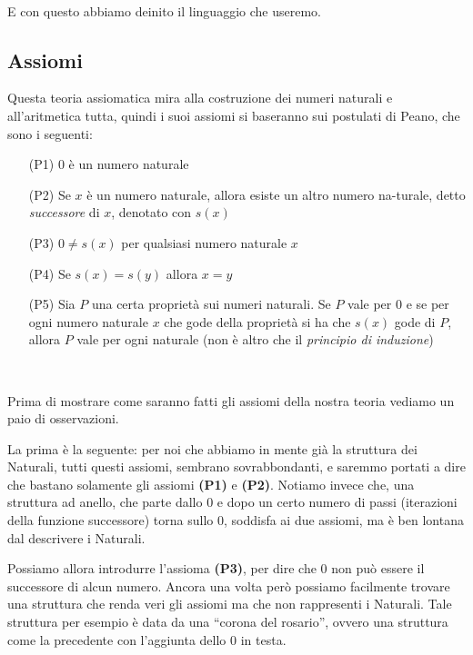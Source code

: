 \begin{enumerate}
\begin{itemize}
\end{itemize}

\end{enumerate}\par\ \par\noindent
\vspace{.5cm}

E con questo abbiamo deinito il linguaggio che useremo.
\subsection{Assiomi}
Questa teoria assiomatica mira alla costruzione dei numeri naturali e all'aritmetica tutta, quindi i suoi 
assiomi si baseranno sui postulati di Peano, che sono i seguenti:
\begin{enumerate}
	\item[(P1)] $0$ \`e un numero naturale
	\item[(P2)] Se $x$ \`e un numero naturale, allora esiste un altro numero na-turale, detto \textsl{successore} di $x$, denotato con $s(x)$
	\item[(P3)] $0\neq s(x)$ per qualsiasi numero naturale $x$
	\item[(P4)] Se $s(x)=s(y)$ allora $x=y$
	\item[(P5)] Sia $P$ una certa propriet\`a sui numeri naturali. Se $P$ vale per $0$ e se per ogni numero naturale $x$ che gode della propriet\`a si ha che $s(x)$ gode di $P$, allora $P$ vale per ogni naturale (non \`e altro che il \textsl{principio di induzione})
\end{enumerate}\par\ \par\noindent

Prima di mostrare come saranno fatti gli assiomi della nostra teoria vediamo un paio di osservazioni.

La prima \`e la seguente:
per noi che abbiamo in mente gi\`a la struttura dei Naturali, tutti questi assiomi, sembrano sovrabbondanti, e saremmo portati a dire che bastano solamente gli assiomi \textbf{(P1)} e \textbf{(P2)}.
Notiamo invece che, una struttura ad anello, che parte dallo 0 e dopo un certo numero di passi (iterazioni della funzione successore) torna sullo 0, soddisfa ai due assiomi, ma \`e ben lontana dal descrivere i Naturali.

Possiamo allora introdurre l'assioma \textbf{(P3)}, per dire che 0 non pu\`o essere il successore di alcun numero.
Ancora una volta per\`o possiamo facilmente trovare una struttura che renda veri gli assiomi ma che non rappresenti i Naturali. Tale struttura per esempio \`e data da una ``corona del rosario'', ovvero una struttura come la precedente con l'aggiunta dello 0 in testa.

